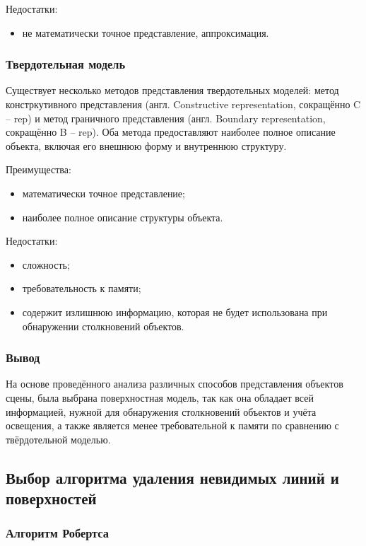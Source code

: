 Недостатки:
\begin{itemize}
    \item не математически точное представление, аппроксимация.
\end{itemize}

\subsubsection{Твердотельная модель}

Существует несколько методов представления твердотельных моделей: метод констркутивного представления (англ. Constructive representation, сокращённо C -- rep) и метод граничного представления (англ. Boundary representation, сокращённо B -- rep). %
Оба метода предоставляют наиболее полное описание объекта, включая его внешнюю форму и внутреннюю структуру.

Преимущества:
\begin{itemize}
    \item математически точное представление;
    \item наиболее полное описание структуры объекта.
\end{itemize}

Недостатки:
\begin{itemize}
    \item сложность;
    \item требовательность к памяти;
    \item содержит излишнюю информацию, которая не будет использована при обнаружении столкновений объектов.
\end{itemize}

\subsubsection*{Вывод}

На основе проведённого анализа различных способов представления объектов сцены, была выбрана поверхностная модель, так как она обладает всей информацией, нужной для обнаружения столкновений объектов и учёта освещения, а также является менее требовательной к памяти по сравнению с твёрдотельной моделью.

\subsection{Выбор алгоритма удаления невидимых линий и поверхностей}

\subsubsection{Алгоритм Робертса}

